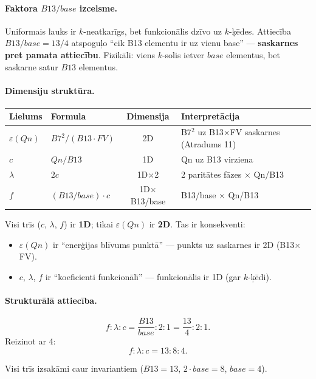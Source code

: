 \documentclass[12pt,a4paper]{article}
\begin{document}
\paragraph{Faktora $B13/base$ izcelsme.}
Uniformais lauks ir $k$-neatkarīgs, bet funkcionālis dzīvo uz $k$-ķēdes. Attiecība $B13/base = 13/4$ atspoguļo ``cik B13 elementu ir uz vienu base'' — \textbf{saskarnes pret pamata attiecību}. Fizikāli: viens $k$-solis ietver $base$ elementus, bet saskarne satur $B13$ elementus.

\paragraph{Dimensiju struktūra.}
\begin{table}[h]
\centering
\begin{tabular}{|l|l|c|l|}
\hline
\textbf{Lielums} & \textbf{Formula} & \textbf{Dimensija} & \textbf{Interpretācija} \\
\hline
$\varepsilon(Qn)$ & $B7^2/(B13\cdot FV)$ & 2D & B7$^2$ uz B13$\times$FV saskarnes (Atradums 11) \\
$c$ & $Qn/B13$ & 1D & Qn uz B13 virziena \\
$\lambda$ & $2c$ & 1D$\times$2 & 2 paritātes fāzes $\times$ Qn/B13 \\
$f$ & $(B13/base)\cdot c$ & 1D$\times$B13/base & B13/base $\times$ Qn/B13 \\
\hline
\end{tabular}
\end{table}

Visi trīs ($c$, $\lambda$, $f$) ir \textbf{1D}; tikai $\varepsilon(Qn)$ ir \textbf{2D}. Tas ir konsekventi:
\begin{itemize}
    \item $\varepsilon(Qn)$ ir ``enerģijas blīvums punktā'' — punkts uz saskarnes ir 2D (B13$\times$FV).
    \item $c$, $\lambda$, $f$ ir ``koeficienti funkcionālī'' — funkcionālis ir 1D (gar $k$-ķēdi).
\end{itemize}

\paragraph{Strukturālā attiecība.}
\[
f : \lambda : c = \frac{B13}{base} : 2 : 1 = \frac{13}{4} : 2 : 1.
\]
Reizinot ar 4:
\[
f : \lambda : c = 13 : 8 : 4.
\]

Visi trīs izsakāmi caur invariantiem ($B13=13$, $2 \cdot base=8$, $base=4$).
\end{document}
